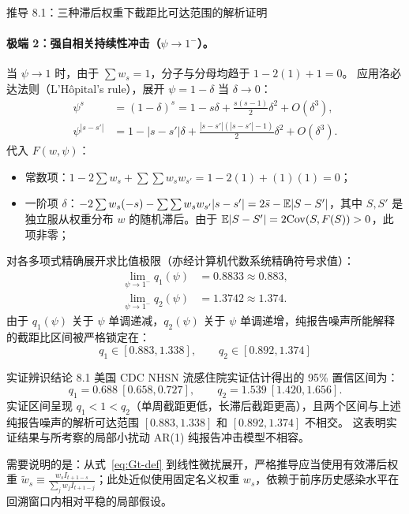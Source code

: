 \begin{derivationbox}{推导 8.1：三种滞后权重下截距比可达范围的解析证明}
\paragraph{极端 2：强自相关持续性冲击（$\psi \to 1^-$）。}
当 $\psi \to 1$ 时，由于 $\sum w_s = 1$，分子与分母均趋于 $1 - 2(1) + 1 = 0$。
应用洛必达法则（L'H\^opital's rule），展开 $\psi = 1 - \delta$ 当 $\delta \to 0$：
\begin{align}
  \psi^s &= (1 - \delta)^s = 1 - s\delta + \frac{s(s-1)}{2}\delta^2 + O(\delta^3), \\
  \psi^{|s-s'|} &= 1 - |s-s'|\delta + \frac{|s-s'|(|s-s'|-1)}{2}\delta^2 + O(\delta^3).
\end{align}
代入 $F(w, \psi)$：
\begin{itemize}
  \item 常数项：$1 - 2\sum w_s + \sum\sum w_s w_{s'} = 1 - 2(1) + (1)(1) = 0$；
  \item 一阶项 $\delta$：$-2\sum w_s(-s) - \sum\sum w_s w_{s'}|s-s'| = 2\bar{s} - \mathbb{E}|S - S'|$，其中 $S, S'$ 是独立服从权重分布 $w$ 的随机滞后。由于 $\mathbb{E}|S-S'| = 2\mathrm{Cov}(S, F(S)) > 0$，此项非零；
\end{itemize}
对各多项式精确展开求比值极限（亦经计算机代数系统精确符号求值）：
\begin{align}
  \lim_{\psi \to 1^-} q_1(\psi) &= 0.8833 \approx 0.883, \\
  \lim_{\psi \to 1^-} q_2(\psi) &= 1.3742 \approx 1.374.
\end{align}
由于 $q_1(\psi)$ 关于 $\psi$ 单调递减，$q_2(\psi)$ 关于 $\psi$ 单调递增，纯报告噪声所能解释的截距比区间被严格锁定在：
\begin{equation}
  \boxed{\, q_1 \in [0.883, 1.338], \qquad q_2 \in [0.892, 1.374] \,}
\end{equation}
\end{derivationbox}

\begin{insightbox}{实证辨识结论 8.1}
美国 CDC NHSN 流感住院实证估计得出的 95\% 置信区间为：
\begin{equation}
  q_1 = 0.688 \ [0.658, 0.727], \qquad q_2 = 1.539 \ [1.420, 1.656].
\end{equation}
实证区间呈现 $q_1 < 1 < q_2$（单周截距更低，长滞后截距更高），且两个区间与上述纯报告噪声的解析可达范围 $[0.883, 1.338]$ 和 $[0.892, 1.374]$ 不相交。
这表明实证结果与所考察的局部小扰动 AR(1) 纯报告冲击模型不相容。

需要说明的是：从式~\eqref{eq:Gt-def} 到线性微扰展开，严格推导应当使用有效滞后权重 $\tilde{w}_s \equiv \frac{w_s I_{t+1-s}}{\sum_j w_j I_{t+1-j}}$；此处近似使用固定名义权重 $w_s$，依赖于前序历史感染水平在回溯窗口内相对平稳的局部假设。
\end{insightbox}
